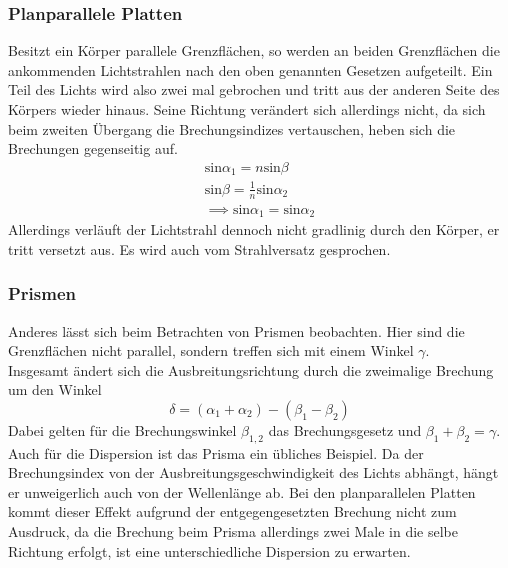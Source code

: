 \subsubsection{Planparallele Platten}
Besitzt ein Körper parallele Grenzflächen, so werden an beiden Grenzflächen
die ankommenden Lichtstrahlen nach den oben genannten Gesetzen aufgeteilt.
Ein Teil des Lichts wird also zwei mal gebrochen und tritt aus der anderen Seite
des Körpers wieder hinaus. Seine Richtung verändert sich allerdings nicht,
da sich beim zweiten Übergang die Brechungsindizes vertauschen, heben sich die
Brechungen gegenseitig auf.
\begin{align*}
    \text{sin}\alpha_1 = n \text{sin}\beta \\
    \text{sin}\beta = \frac{1}{n} \text{sin}\alpha_2\\
    \implies \text{sin}\alpha_1 = \text{sin}\alpha_2
\end{align*}
Allerdings verläuft der Lichtstrahl dennoch nicht gradlinig durch den Körper,
er tritt versetzt aus. Es wird auch vom Strahlversatz gesprochen.

\subsubsection{Prismen}
Anderes lässt sich beim Betrachten von Prismen beobachten. Hier sind die 
Grenzflächen nicht parallel, sondern treffen sich mit einem Winkel $\gamma$.\\
Insgesamt ändert sich die Ausbreitungsrichtung
durch die zweimalige Brechung um den Winkel
\begin{equation}
    \delta = \left( \alpha_1 + \alpha_2 \right) - \left( \beta_1 - \beta_2 \right)
    \label{eqn:prisma}
\end{equation}
Dabei gelten für die Brechungswinkel $\beta_{1, 2}$ das Brechungsgesetz und $\beta_1 + \beta_2 = \gamma$.
\\
Auch für die Dispersion ist das Prisma ein übliches Beispiel. Da der Brechungsindex
von der Ausbreitungsgeschwindigkeit des Lichts abhängt, hängt er unweigerlich auch
von der Wellenlänge ab. Bei den planparallelen Platten kommt dieser Effekt 
aufgrund der entgegengesetzten Brechung nicht zum Ausdruck, 
da die Brechung beim Prisma allerdings zwei Male in die selbe Richtung 
erfolgt, ist eine unterschiedliche Dispersion zu erwarten.

